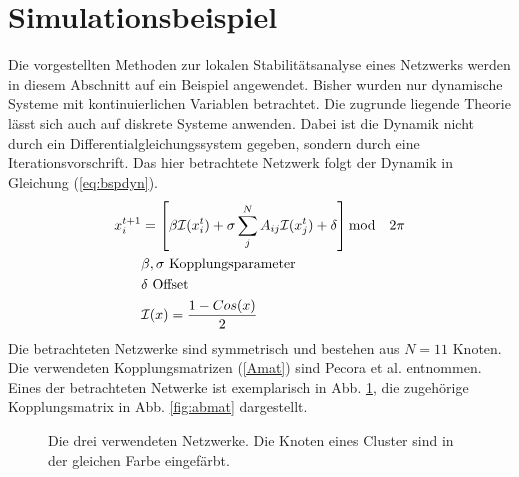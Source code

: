 \section{Simulationsbeispiel}
Die vorgestellten Methoden zur lokalen Stabilitätsanalyse eines Netzwerks werden in diesem Abschnitt auf ein Beispiel angewendet. Bisher wurden nur dynamische Systeme mit kontinuierlichen Variablen betrachtet. Die zugrunde liegende Theorie lässt sich auch auf diskrete Systeme anwenden. Dabei ist die Dynamik nicht durch ein Differentialgleichungssystem gegeben, sondern durch eine Iterationsvorschrift. Das hier betrachtete Netzwerk \cite{pecora2014} folgt der Dynamik in Gleichung (\ref{eq:bspdyn}).
\begin{align}
\label{eq:bspdyn}
	x_i^{t+1}&=\left[\beta\mathcal{I}(x_i^t)+\sigma \sum_j^N A_{ij}\mathcal{I}(x_j^t)+\delta\right] \text{mod}\quad 2\pi
	\\\notag & \beta,\sigma \text{ Kopplungsparameter}
	\\\notag  & \delta \text{ Offset}
	\\\notag &\mathcal{I}(x)=\frac{1-Cos(x)}{2}
\end{align}
Die betrachteten Netzwerke sind symmetrisch und bestehen aus $N=11$ Knoten. Die verwendeten Kopplungsmatrizen (\ref{Amat}) sind Pecora et al. \cite{pecora2014} entnommen. Eines der betrachteten Netwerke ist exemplarisch in Abb. \ref{fig:cluster}, die zugehörige Kopplungsmatrix in Abb. \ref{fig:abmat} dargestellt. 
\begin{figure}
	 \centering
	 \caption[In der Simulation verwendete Netzwerke]{Die drei verwendeten Netzwerke. Die Knoten eines Cluster sind in der gleichen Farbe eingefärbt.}
	 \label{fig:cluster}
\end{figure}

